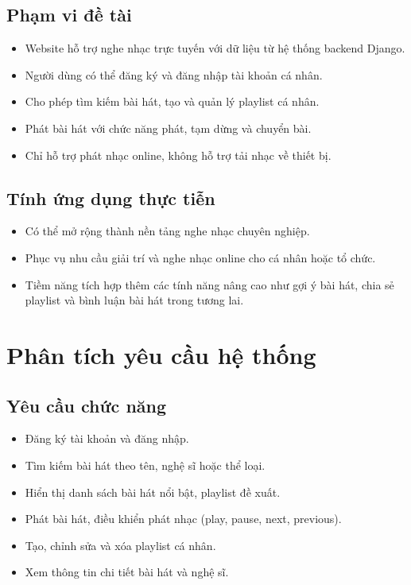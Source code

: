 \documentclass[a4paper]{article}
\begin{document}
\subsection{Phạm vi đề tài}
\begin{itemize}
    \item Website hỗ trợ nghe nhạc trực tuyến với dữ liệu từ hệ thống backend Django.
    \item Người dùng có thể đăng ký và đăng nhập tài khoản cá nhân.
    \item Cho phép tìm kiếm bài hát, tạo và quản lý playlist cá nhân.
    \item Phát bài hát với chức năng phát, tạm dừng và chuyển bài.
    \item Chỉ hỗ trợ phát nhạc online, không hỗ trợ tải nhạc về thiết bị.
\end{itemize}

\subsection{Tính ứng dụng thực tiễn}
\begin{itemize}
    \item Có thể mở rộng thành nền tảng nghe nhạc chuyên nghiệp.
    \item Phục vụ nhu cầu giải trí và nghe nhạc online cho cá nhân hoặc tổ chức.
    \item Tiềm năng tích hợp thêm các tính năng nâng cao như gợi ý bài hát, chia sẻ playlist và bình luận bài hát trong tương lai.
\end{itemize}

\newpage
\section{Phân tích yêu cầu hệ thống}
\subsection{Yêu cầu chức năng}
\begin{itemize}
    \item Đăng ký tài khoản và đăng nhập.
    \item Tìm kiếm bài hát theo tên, nghệ sĩ hoặc thể loại.
    \item Hiển thị danh sách bài hát nổi bật, playlist đề xuất.
    \item Phát bài hát, điều khiển phát nhạc (play, pause, next, previous).
    \item Tạo, chỉnh sửa và xóa playlist cá nhân.
    \item Xem thông tin chi tiết bài hát và nghệ sĩ.
\end{itemize}
\end{document}
